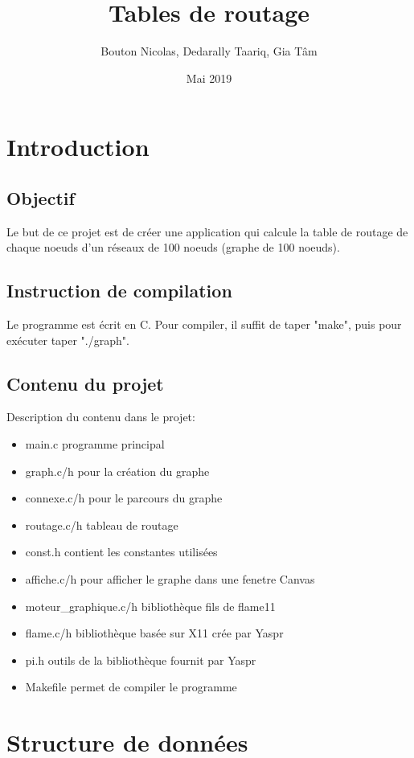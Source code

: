 \documentclass[a4paper,11pt]{report}
\title{Tables de routage}
\author{Bouton Nicolas, Dedarally Taariq, Gia Tâm}
\date {Mai 2019}
\begin{document}
\maketitle
\tableofcontents


\chapter{Introduction}
\section{Objectif}
Le but de ce projet est de créer une application qui calcule la table de routage de chaque noeuds d'un réseaux de 100 noeuds (graphe de 100 noeuds). 
\section{Instruction de compilation}
Le programme est écrit en C. Pour compiler, il suffit de taper "make", puis pour exécuter taper "./graph".

\section{Contenu du projet}
Description du contenu dans le projet:
\begin{itemize}
  \item main.c programme principal
  \item graph.c/h pour la création du graphe
  \item connexe.c/h pour le parcours du graphe
  \item routage.c/h tableau de routage
  \item const.h contient les constantes utilisées 
  \item affiche.c/h pour afficher le graphe dans une fenetre Canvas
  \item moteur\_graphique.c/h bibliothèque fils de flame11
  \item flame.c/h bibliothèque basée sur X11 crée par Yaspr
  \item pi.h outils de la bibliothèque fournit par Yaspr
  \item Makefile permet de compiler le programme
\end{itemize}

\chapter{Structure de données}
\end{document}

